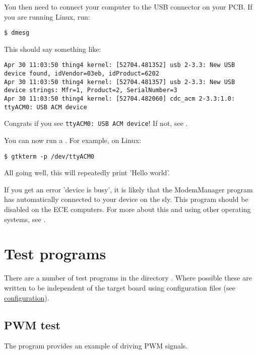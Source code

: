 You then need to connect your computer to the USB connector on your PCB.
If you are running Linux, run:
%
\begin{verbatim}
$ dmesg
\end{verbatim}

This should say something like:
%
\begin{verbatim}
Apr 30 11:03:50 thing4 kernel: [52704.481352] usb 2-3.3: New USB device found, idVendor=03eb, idProduct=6202
Apr 30 11:03:50 thing4 kernel: [52704.481357] usb 2-3.3: New USB device strings: Mfr=1, Product=2, SerialNumber=3
Apr 30 11:03:50 thing4 kernel: [52704.482060] cdc_acm 2-3.3:1.0: ttyACM0: USB ACM device
\end{verbatim}

Congrats if you see \texttt{ttyACM0:\ USB\ ACM\ device}!  If not, see
.

You can now run a . For example, on Linux:

\begin{verbatim}
$ gtkterm -p /dev/ttyACM0
\end{verbatim}

All going well, this will repeatedly print 'Hello world'.

If you get an error 'device is busy', it is likely that the ModemManager
program has automatically connected to your device on the sly. This
program should be disabled on the ECE computers. For more about this and
using other operating systems, see .

\section{Test programs}
\label{test-programs}

There are a number of test programs in the directory
. Where possible these are written to be
independent of the target board using configuration files (see
\protect\hyperref[configuration]{configuration}).

\subsection{PWM test}
\label{pwm-test}

The program  provides an
example of driving PWM signals.

\inputminted{C}{../../src/test-apps/pwm_test2/pwm_test2.c}

